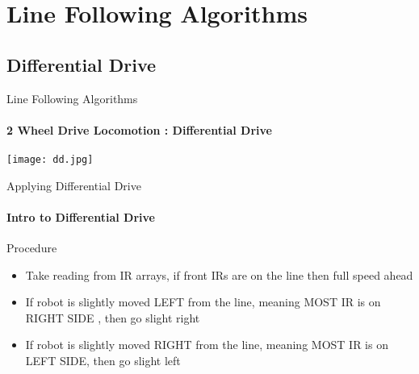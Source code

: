 \documentclass{beamer}
\begin{document}
	\section{Line Following Algorithms}
	
	\subsection{Differential Drive}
	
	\begin{frame}{Line Following Algorithms}
	
		\framesubtitle{2 Wheel Drive Locomotion : Differential Drive}
		
		\texttt{[image: dd.jpg]}
		
		
	\end{frame}
	
	
	\begin{frame}{Applying Differential Drive}
	
	\framesubtitle{Intro to Differential Drive}
	
	\bigskip

	\begin{alertblock}{Procedure}
	
		\begin{itemize}
		
			\item{Take reading from IR arrays, if front IRs are on the line then full speed ahead}
			
			\item{If robot is slightly moved LEFT from the line, meaning MOST IR is on RIGHT SIDE , then go slight right}
			
			\item{If robot is slightly moved RIGHT from the line, meaning MOST IR is on LEFT SIDE, then go slight left} 
			
		
		\end{itemize}			
		
	\end{alertblock}
				
	
	\end{frame}
	
	
	
\end{document}
